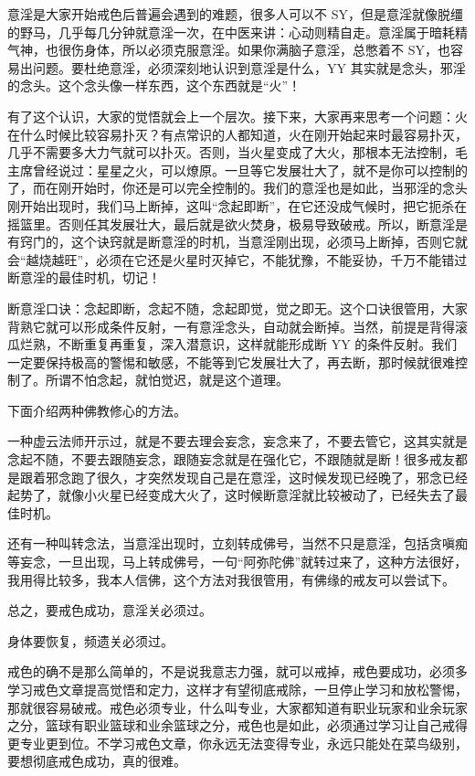 \documentclass{ctexart}
\begin{document}
意淫是大家开始戒色后普遍会遇到的难题，很多人可以不 SY，但是意淫就像脱缰的野马，几乎每几分钟就意淫一次，在中医来讲：心动则精自走。意淫属于暗耗精气神，也很伤身体，所以必须克服意淫。如果你满脑子意淫，总憋着不 SY，也容易出问题。要杜绝意淫，必须深刻地认识到意淫是什么，YY 其实就是念头，邪淫的念头。这个念头像一样东西，这个东西就是“火”！

有了这个认识，大家的觉悟就会上一个层次。接下来，大家再来思考一个问题：火在什么时候比较容易扑灭？有点常识的人都知道，火在刚开始起来时最容易扑灭，几乎不需要多大力气就可以扑灭。否则，当火星变成了大火，那根本无法控制，毛主席曾经说过：星星之火，可以燎原。一旦等它发展壮大了，就不是你可以控制的了，而在刚开始时，你还是可以完全控制的。我们的意淫也是如此，当邪淫的念头刚开始出现时，我们马上断掉，这叫“念起即断”，在它还没成气候时，把它扼杀在摇篮里。否则任其发展壮大，最后就是欲火焚身，极易导致破戒。所以，断意淫是有窍门的，这个诀窍就是断意淫的时机，当意淫刚出现，必须马上断掉，否则它就会“越烧越旺”，必须在它还是火星时灭掉它，不能犹豫，不能妥协，千万不能错过断意淫的最佳时机，切记！

断意淫口诀：念起即断，念起不随，念起即觉，觉之即无。这个口诀很管用，大家背熟它就可以形成条件反射，一有意淫念头，自动就会断掉。当然，前提是背得滚瓜烂熟，不断重复再重复，深入潜意识，这样就能形成断 YY 的条件反射。我们一定要保持极高的警惕和敏感，不能等到它发展壮大了，再去断，那时候就很难控制了。所谓不怕念起，就怕觉迟，就是这个道理。

下面介绍两种佛教修心的方法。

一种虚云法师开示过，就是不要去理会妄念，妄念来了，不要去管它，这其实就是念起不随，不要去跟随妄念，跟随妄念就是在强化它，不跟随就是断！很多戒友都是跟着邪念跑了很久，才突然发现自己是在意淫，这时候发现已经晚了，邪念已经起势了，就像小火星已经变成大火了，这时候断意淫就比较被动了，已经失去了最佳时机。

还有一种叫转念法，当意淫出现时，立刻转成佛号，当然不只是意淫，包括贪嗔痴等妄念，一旦出现，马上转成佛号，一句“阿弥陀佛”就转过来了，这种方法很好，我用得比较多，我本人信佛，这个方法对我很管用，有佛缘的戒友可以尝试下。

总之，要戒色成功，意淫关必须过。

身体要恢复，频遗关必须过。

戒色的确不是那么简单的，不是说我意志力强，就可以戒掉，戒色要成功，必须多学习戒色文章提高觉悟和定力，这样才有望彻底戒除，一旦停止学习和放松警惕，那就很容易破戒。戒色必须专业，什么叫专业，大家都知道有职业玩家和业余玩家之分，篮球有职业篮球和业余篮球之分，戒色也是如此，必须通过学习让自己戒得更专业更到位。不学习戒色文章，你永远无法变得专业，永远只能处在菜鸟级别，要想彻底戒色成功，真的很难。
\end{document}
